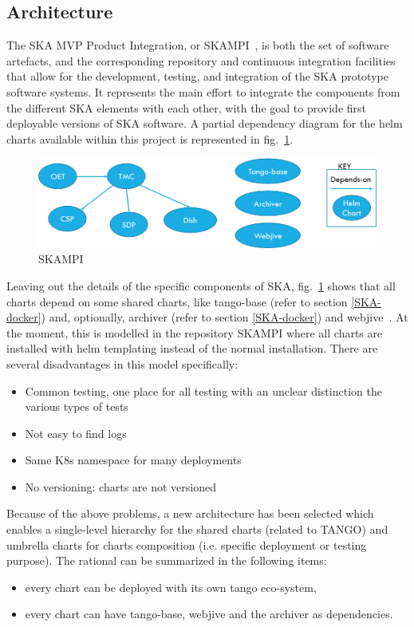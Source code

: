 \documentclass[a4paper]{spie}  %
\begin{document}
\subsection{Architecture}

The SKA MVP Product Integration, or SKAMPI~\cite{SKAMPI}, is both the set of software artefacts, and the corresponding repository and continuous integration facilities that allow for the development, testing, and integration of the SKA prototype software systems. It represents the main effort to integrate the components from the different SKA elements with each other, with the goal to provide first deployable versions of SKA software. A partial dependency diagram for the helm charts available within this project is represented in fig.~\ref{fig:skampi}.

\begin{figure}[!htb]
   \centering
   \includegraphics*[width=1\columnwidth]{simple_skampi}
   \caption{SKAMPI}
   \label{fig:skampi}
\end{figure}

Leaving out the details of the specific components of SKA, fig.~\ref{fig:skampi} shows that all charts depend on some shared charts, like tango-base (refer to section \ref{SKA-docker}) and, optionally, archiver (refer to section \ref{SKA-docker}) and webjive~\cite{webjive}.
At the moment, this is modelled in the repository SKAMPI where all charts are installed with helm templating instead of the normal installation. There are several disadvantages in this model specifically:

\begin{itemize}
    \item Common testing, one place for all testing with an unclear distinction the various types of tests
    \item Not easy to find logs
    \item Same K8s namespace for many deployments
    \item No versioning: charts are not versioned
\end{itemize}

Because of the above problems, a new architecture has been selected which enables a single-level hierarchy for the shared charts (related to TANGO) and umbrella charts for charts composition (i.e. specific deployment or testing purpose). The rational can be summarized in the following items:
\begin{itemize}
    \item every chart can be deployed with its own tango eco-system,
    \item every chart can have tango-base, webjive and the archiver as dependencies.
\end{itemize}
\end{document}
